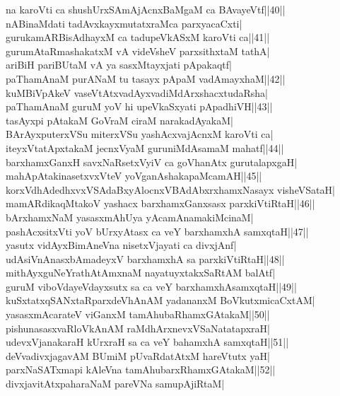 \documentclass{article}
\begin{document}
na karoVti ca shushUrxSAmAjAcnxBaMgaM ca BAvayeVtf||40||\\
nABinaMdati tadAvxkayxmutatxraMca parxyacaCxti|\\
gurukamARBisAdhayxM ca tadupeVkASxM karoVti ca||41||\\
gurumAtaRmashakatxM vA videVsheV parxsithxtaM tathA|\\
ariBiH pariBUtaM vA ya sasxMtayxjati pApakaqtf|\\
paThamAnaM purANaM tu tasayx pApaM vadAmayxhaM||42||\\
kuMBiVpAkeV vaseVtAtxvadAyxvadiMdArxshacxtudaRsha|\\
paThamAnaM guruM yoV hi upeVkaSxyati pApadhiVH||43||\\
tasAyxpi pAtakaM GoVraM ciraM narakadAyakaM|\\
BArAyxputerxVSu miterxVSu yashAcxvajAcnxM karoVti ca|\\
iteyxVtatApxtakaM jecnxVyaM guruniMdAsamaM mahatf||44||\\
barxhamxGanxH savxNaRsetxVyiV ca goVhanAtx gurutalapxgaH|\\
mahApAtakinasetxvxVteV yoVganAshakapaMcamAH||45||\\
korxVdhAdedhxvxVSAdaBxyAlocnxVBAdAbxrxhamxNasayx visheVSataH|\\
mamARdikaqMtakoV yashacx barxhamxGanxsasx parxkiVtiRtaH||46||\\
bArxhamxNaM yasasxmAhUya yAcamAnamakiMcinaM|\\
pashAcxsitxVti yoV bUrxyAtasx ca veY barxhamxhA samxqtaH||47||\\
yasutx vidAyxBimAneVna nisetxVjayati ca divxjAnf|\\
udAsiVnAnasxbAmadeyxV barxhamxhA sa parxkiVtiRtaH||48||\\
mithAyxguNeYrathAtAmxnaM nayatuyxtakxSaRtAM balAtf|\\
guruM viboVdayeVdayxsutx sa ca veY barxhamxhAsamxqtaH||49||\\
kuSxtatxqSANxtaRparxdeVhAnAM yadananxM BoVkutxmicaCxtAM|\\
yasasxmAcarateV viGanxM tamAhubaRhamxGAtakaM||50||\\
pishunasasxvaRloVkAnAM raMdhArxnevxVSaNatatapxraH|\\
udevxVjanakaraH kUrxraH sa ca veY bahamxhA samxqtaH||51||\\
deVvadivxjagavAM BUmiM pUvaRdatAtxM hareVtutx yaH|\\
parxNaSATxmapi kAleVna tamAhubarxRhamxGAtakaM||52||\\
divxjavitAtxpaharaNaM pareVNa samupAjiRtaM|\\
\end{document}
